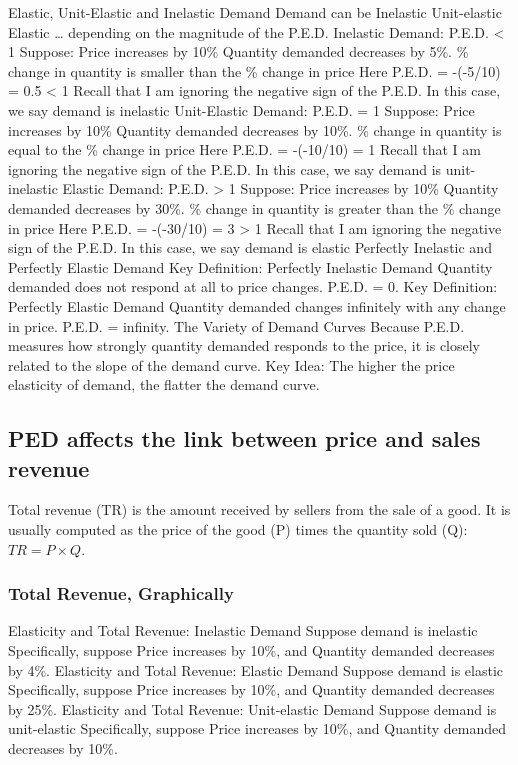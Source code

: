 \documentclass[
  letterpaper,
]{book}
\begin{document}
Elastic, Unit-Elastic and Inelastic Demand Demand can be Inelastic
Unit-elastic Elastic \ldots{} depending on the magnitude of the P.E.D.
Inelastic Demand: P.E.D. \textless{} 1 Suppose: Price increases by 10\%
Quantity demanded decreases by 5\%. \% change in quantity is smaller
than the \% change in price Here P.E.D. = -(-5/10) = 0.5 \textless{} 1
Recall that I am ignoring the negative sign of the P.E.D. In this case,
we say demand is inelastic Unit-Elastic Demand: P.E.D. = 1 Suppose:
Price increases by 10\% Quantity demanded decreases by 10\%. \% change
in quantity is equal to the \% change in price Here P.E.D. = -(-10/10) =
1 Recall that I am ignoring the negative sign of the P.E.D. In this
case, we say demand is unit-inelastic Elastic Demand: P.E.D.
\textgreater{} 1 Suppose: Price increases by 10\% Quantity demanded
decreases by 30\%. \% change in quantity is greater than the \% change
in price Here P.E.D. = -(-30/10) = 3 \textgreater{} 1 Recall that I am
ignoring the negative sign of the P.E.D. In this case, we say demand is
elastic Perfectly Inelastic and Perfectly Elastic Demand Key Definition:
Perfectly Inelastic Demand Quantity demanded does not respond at all to
price changes. P.E.D. = 0. Key Definition: Perfectly Elastic Demand
Quantity demanded changes infinitely with any change in price. P.E.D. =
infinity. The Variety of Demand Curves Because P.E.D. measures how
strongly quantity demanded responds to the price, it is closely related
to the slope of the demand curve. Key Idea: The higher the price
elasticity of demand, the flatter the demand curve.

\subsection{PED affects the link between price and sales
revenue}\label{ped-affects-the-link-between-price-and-sales-revenue}

Total revenue (TR) is the amount received by sellers from the sale of a
good. It is usually computed as the price of the good (P) times the
quantity sold (Q): \(TR=P\times Q\).

\subsubsection{Total Revenue,
Graphically}\label{total-revenue-graphically}

Elasticity and Total Revenue: Inelastic Demand Suppose demand is
inelastic Specifically, suppose Price increases by 10\%, and Quantity
demanded decreases by 4\%. Elasticity and Total Revenue: Elastic Demand
Suppose demand is elastic Specifically, suppose Price increases by 10\%,
and Quantity demanded decreases by 25\%. Elasticity and Total Revenue:
Unit-elastic Demand Suppose demand is unit-elastic Specifically, suppose
Price increases by 10\%, and Quantity demanded decreases by 10\%.
\end{document}
